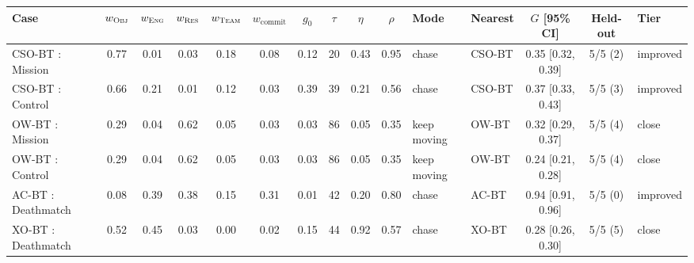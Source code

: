 \begin{tabular}{@{}lcccccccccl lccl@{}}
\toprule
Case & $w_{\textsc{Obj}}$ & $w_{\textsc{Eng}}$ & $w_{\textsc{Res}}$ & $w_{\textsc{Team}}$ & $w_{\mathrm{commit}}$ & $g_0$ & $\tau$ & $\eta$ & $\rho$ & Mode & Nearest & $G$ [95\% CI] & Held-out & Tier \\
\midrule
CSO-BT : Mission & 0.77 & 0.01 & 0.03 & 0.18 & 0.08 & 0.12 & 20 & 0.43 & 0.95 & chase & CSO-BT & 0.35 [0.32, 0.39] & 5/5 (2) & improved \\
CSO-BT : Control & 0.66 & 0.21 & 0.01 & 0.12 & 0.03 & 0.39 & 39 & 0.21 & 0.56 & chase & CSO-BT & 0.37 [0.33, 0.43] & 5/5 (3) & improved \\
OW-BT : Mission & 0.29 & 0.04 & 0.62 & 0.05 & 0.03 & 0.03 & 86 & 0.05 & 0.35 & keep moving & OW-BT & 0.32 [0.29, 0.37] & 5/5 (4) & close \\
OW-BT : Control & 0.29 & 0.04 & 0.62 & 0.05 & 0.03 & 0.03 & 86 & 0.05 & 0.35 & keep moving & OW-BT & 0.24 [0.21, 0.28] & 5/5 (4) & close \\
AC-BT : Deathmatch & 0.08 & 0.39 & 0.38 & 0.15 & 0.31 & 0.01 & 42 & 0.20 & 0.80 & chase & AC-BT & 0.94 [0.91, 0.96] & 5/5 (0) & improved \\
XO-BT : Deathmatch & 0.52 & 0.45 & 0.03 & 0.00 & 0.02 & 0.15 & 44 & 0.92 & 0.57 & chase & XO-BT & 0.28 [0.26, 0.30] & 5/5 (5) & close \\
\bottomrule
\end{tabular}
